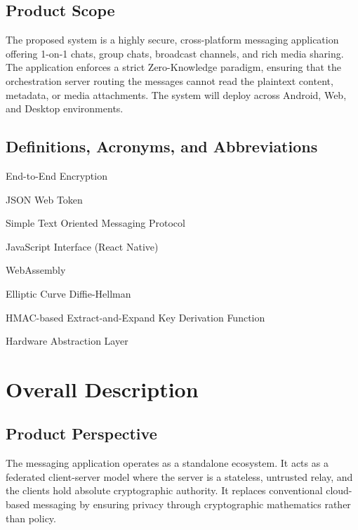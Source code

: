 \documentclass[12pt, a4paper]{article}
\begin{document}
\subsection{Product Scope}
The proposed system is a highly secure, cross-platform messaging application offering 1-on-1 chats, group chats, broadcast channels, and rich media sharing. The application enforces a strict Zero-Knowledge paradigm, ensuring that the orchestration server routing the messages cannot read the plaintext content, metadata, or media attachments. The system will deploy across Android, Web, and Desktop environments.

\subsection{Definitions, Acronyms, and Abbreviations}
\begin{description}[style=multiline, leftmargin=3cm]
    \item[E2EE] End-to-End Encryption
    \item[JWT] JSON Web Token
    \item[STOMP] Simple Text Oriented Messaging Protocol
    \item[JSI] JavaScript Interface (React Native)
    \item[Wasm] WebAssembly
    \item[ECDH] Elliptic Curve Diffie-Hellman
    \item[HKDF] HMAC-based Extract-and-Expand Key Derivation Function
    \item[HAL] Hardware Abstraction Layer
\end{description}

\section{Overall Description}
\subsection{Product Perspective}
The messaging application operates as a standalone ecosystem. It acts as a federated client-server model where the server is a stateless, untrusted relay, and the clients hold absolute cryptographic authority. It replaces conventional cloud-based messaging by ensuring privacy through cryptographic mathematics rather than policy.
\end{document}
